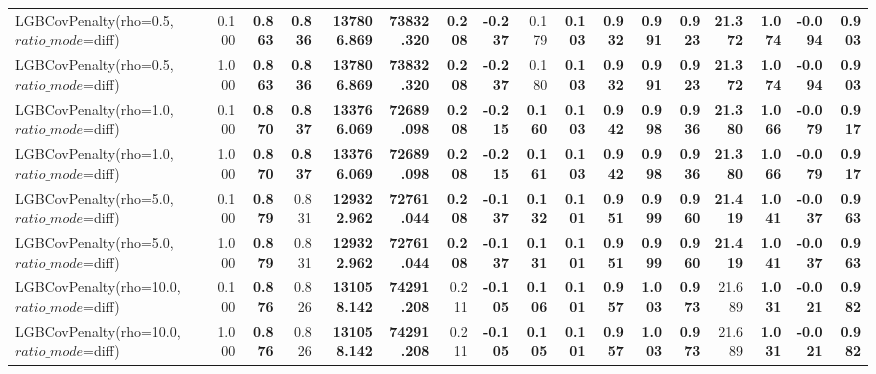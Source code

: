 \documentclass[11pt]{article}
\theoremstyle{plain}
\theoremstyle{definition}
\newcommand{\1}{\mathbf{1}}
\begin{document}
\begin{table}[htbp]
{\begin{tabular}{lrrrrrrrrrrrrrrrr}
LGBCovPenalty(rho=0.5, $ratio\_mode$=diff) & 0.100 & \textbf{0.863} & \textbf{0.836} & \textbf{137806.869} & \textbf{73832.320} & \textbf{0.208} & \textbf{-0.237} & 0.179 & \textbf{0.103} & \textbf{0.932} & \textbf{0.991} & \textbf{0.923} & \textbf{21.372} & \textbf{1.074} & \textbf{-0.094} & \textbf{0.903} \\
LGBCovPenalty(rho=0.5, $ratio\_mode$=diff) & 1.000 & \textbf{0.863} & \textbf{0.836} & \textbf{137806.869} & \textbf{73832.320} & \textbf{0.208} & \textbf{-0.237} & 0.180 & \textbf{0.103} & \textbf{0.932} & \textbf{0.991} & \textbf{0.923} & \textbf{21.372} & \textbf{1.074} & \textbf{-0.094} & \textbf{0.903} \\
LGBCovPenalty(rho=1.0, $ratio\_mode$=diff) & 0.100 & \textbf{0.870} & \textbf{0.837} & \textbf{133766.069} & \textbf{72689.098} & \textbf{0.208} & \textbf{-0.215} & \textbf{0.160} & \textbf{0.103} & \textbf{0.942} & \textbf{0.998} & \textbf{0.936} & \textbf{21.380} & \textbf{1.066} & \textbf{-0.079} & \textbf{0.917} \\
LGBCovPenalty(rho=1.0, $ratio\_mode$=diff) & 1.000 & \textbf{0.870} & \textbf{0.837} & \textbf{133766.069} & \textbf{72689.098} & \textbf{0.208} & \textbf{-0.215} & \textbf{0.161} & \textbf{0.103} & \textbf{0.942} & \textbf{0.998} & \textbf{0.936} & \textbf{21.380} & \textbf{1.066} & \textbf{-0.079} & \textbf{0.917} \\
LGBCovPenalty(rho=5.0, $ratio\_mode$=diff) & 0.100 & \textbf{0.879} & 0.831 & \textbf{129322.962} & \textbf{72761.044} & \textbf{0.208} & \textbf{-0.137} & \textbf{0.132} & \textbf{0.101} & \textbf{0.951} & \textbf{0.999} & \textbf{0.960} & \textbf{21.419} & \textbf{1.041} & \textbf{-0.037} & \textbf{0.963} \\
LGBCovPenalty(rho=5.0, $ratio\_mode$=diff) & 1.000 & \textbf{0.879} & 0.831 & \textbf{129322.962} & \textbf{72761.044} & \textbf{0.208} & \textbf{-0.137} & \textbf{0.131} & \textbf{0.101} & \textbf{0.951} & \textbf{0.999} & \textbf{0.960} & \textbf{21.419} & \textbf{1.041} & \textbf{-0.037} & \textbf{0.963} \\
LGBCovPenalty(rho=10.0, $ratio\_mode$=diff) & 0.100 & \textbf{0.876} & 0.826 & \textbf{131058.142} & \textbf{74291.208} & 0.211 & \textbf{-0.105} & \textbf{0.106} & \textbf{0.101} & \textbf{0.957} & \textbf{1.003} & \textbf{0.973} & 21.689 & \textbf{1.031} & \textbf{-0.021} & \textbf{0.982} \\
LGBCovPenalty(rho=10.0, $ratio\_mode$=diff) & 1.000 & \textbf{0.876} & 0.826 & \textbf{131058.142} & \textbf{74291.208} & 0.211 & \textbf{-0.105} & \textbf{0.105} & \textbf{0.101} & \textbf{0.957} & \textbf{1.003} & \textbf{0.973} & 21.689 & \textbf{1.031} & \textbf{-0.021} & \textbf{0.982} \\

\end{tabular}}
\end{table}
\end{document}
